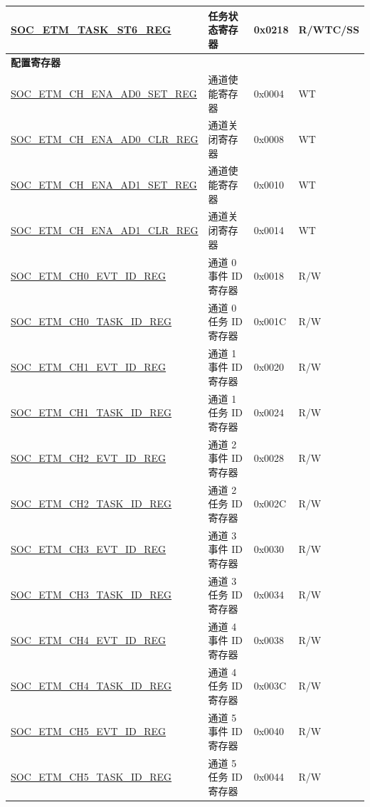 \begin{longtable}{ | p{6cm} | p{6.4cm} | p{1.3cm} | p{1.8cm} | }
\hyperref[regdesc:SOCETMTASKST6REG]{SOC\_ETM\_TASK\_ST6\_REG} & 任务状态寄存器 & 0x0218 & R/WTC/SS \\ \hline
\multicolumn{4}{|l|}{\textbf{配置寄存器}} \\ \hline
\hyperref[regdesc:SOCETMCHENAAD0SETREG]{SOC\_ETM\_CH\_ENA\_AD0\_SET\_REG} & 通道使能寄存器 & 0x0004 & WT \\ \hline
\hyperref[regdesc:SOCETMCHENAAD0CLRREG]{SOC\_ETM\_CH\_ENA\_AD0\_CLR\_REG} & 通道关闭寄存器 & 0x0008 & WT \\ \hline
\hyperref[regdesc:SOCETMCHENAAD1SETREG]{SOC\_ETM\_CH\_ENA\_AD1\_SET\_REG} & 通道使能寄存器 & 0x0010 & WT \\ \hline
\hyperref[regdesc:SOCETMCHENAAD1CLRREG]{SOC\_ETM\_CH\_ENA\_AD1\_CLR\_REG} & 通道关闭寄存器 & 0x0014 & WT \\ \hline
\hyperref[regdesc:SOCETMCH0EVTIDREG]{SOC\_ETM\_CH0\_EVT\_ID\_REG} & 通道 0 事件 ID 寄存器 & 0x0018 & R/W \\ \hline
\hyperref[regdesc:SOCETMCH0TASKIDREG]{SOC\_ETM\_CH0\_TASK\_ID\_REG} & 通道 0 任务 ID 寄存器 & 0x001C & R/W \\ \hline
\hyperref[regdesc:SOCETMCH0EVTIDREG]{SOC\_ETM\_CH1\_EVT\_ID\_REG} & 通道 1 事件 ID 寄存器 & 0x0020 & R/W \\ \hline
\hyperref[regdesc:SOCETMCH0TASKIDREG]{SOC\_ETM\_CH1\_TASK\_ID\_REG} & 通道 1 任务 ID 寄存器 & 0x0024 & R/W \\ \hline
\hyperref[regdesc:SOCETMCH0EVTIDREG]{SOC\_ETM\_CH2\_EVT\_ID\_REG} & 通道 2 事件 ID 寄存器 & 0x0028 & R/W \\ \hline
\hyperref[regdesc:SOCETMCH0TASKIDREG]{SOC\_ETM\_CH2\_TASK\_ID\_REG} & 通道 2 任务 ID 寄存器 & 0x002C & R/W \\ \hline
\hyperref[regdesc:SOCETMCH0EVTIDREG]{SOC\_ETM\_CH3\_EVT\_ID\_REG} & 通道 3 事件 ID 寄存器 & 0x0030 & R/W \\ \hline
\hyperref[regdesc:SOCETMCH0TASKIDREG]{SOC\_ETM\_CH3\_TASK\_ID\_REG} & 通道 3 任务 ID 寄存器 & 0x0034 & R/W \\ \hline
\hyperref[regdesc:SOCETMCH0EVTIDREG]{SOC\_ETM\_CH4\_EVT\_ID\_REG} & 通道 4 事件 ID 寄存器 & 0x0038 & R/W \\ \hline
\hyperref[regdesc:SOCETMCH0TASKIDREG]{SOC\_ETM\_CH4\_TASK\_ID\_REG} & 通道 4 任务 ID 寄存器 & 0x003C & R/W \\ \hline
\hyperref[regdesc:SOCETMCH0EVTIDREG]{SOC\_ETM\_CH5\_EVT\_ID\_REG} & 通道 5 事件 ID 寄存器 & 0x0040 & R/W \\ \hline
\hyperref[regdesc:SOCETMCH0TASKIDREG]{SOC\_ETM\_CH5\_TASK\_ID\_REG} & 通道 5 任务 ID 寄存器 & 0x0044 & R/W \\ \hline

\end{longtable}
